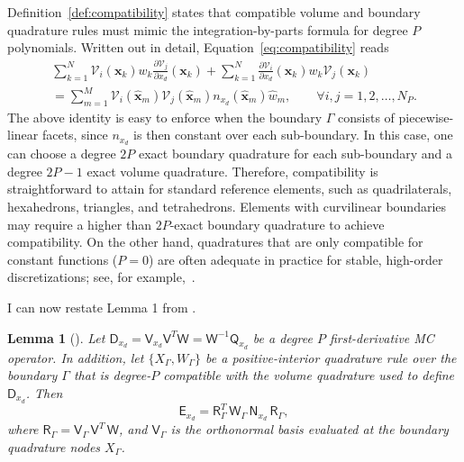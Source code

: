 \documentclass[pdflatex,sn-mathphys-num]{sn-jnl}%
\theoremstyle{thmstyleone}%
\newtheorem{lemma}{Lemma}%
\theoremstyle{thmstyletwo}%
\theoremstyle{thmstylethree}%
\newcommand{\mat}[1]{\ensuremath{\mathsf{#1}}}
\newcommand{\fnc}[1]{\ensuremath{\mathcal{#1}}}
\begin{document}
Definition~\ref{def:compatibility} states that compatible volume and boundary quadrature rules must mimic the integration-by-parts formula for degree $P$ polynomials.  Written out in detail, Equation~\eqref{eq:compatibility} reads
\begin{multline*}
    \sum_{k=1}^{N} \fnc{V}_i(\bm{x}_k) w_k \frac{\partial \fnc{V}_j}{\partial x_d}(\bm{x}_k) + \sum_{k=1}^{N} \frac{\partial \fnc{V}_i}{\partial x_d} (\bm{x}_k) w_k \fnc{V}_j (\bm{x}_k) \\
    = \sum_{m=1}^{M} \fnc{V}_i(\hat{\bm{x}}_m) \fnc{V}_j(\hat{\bm{x}}_m) n_{x_d}(\hat{\bm{x}}_m) \hat{w}_m,\qquad \forall i,j = 1,2,\ldots,N_P.
\end{multline*}
The above identity is easy to enforce when the boundary $\Gamma$ consists of piecewise-linear facets, since $n_{x_d}$ is then constant over each sub-boundary.  In this case, one can choose a degree $2P$ exact boundary quadrature for each sub-boundary and a degree $2P-1$ exact volume quadrature.  Therefore, compatibility is straightforward to attain for standard reference elements, such as quadrilaterals, hexahedrons, triangles, and tetrahedrons.  Elements with curvilinear boundaries may require a higher than $2P$-exact boundary quadrature to achieve compatibility. On the other hand, quadratures that are only compatible for constant functions ($P=0$) are often adequate in practice for stable, high-order discretizations; see, for example,~\cite[Sec.~5]{Crean2018entropy}.

I can now restate Lemma 1 from \cite{Chan2018discretely}.


\begin{lemma}[\cite{Chan2018discretely}]\label{thm:mc_boundary}
    Let $\mat{D}_{x_d} = \mat{V}_{x_d} \mat{V}^T \mat{W} = \mat{W}^{-1} \mat{Q}_{x_d}$ be a degree $P$ first-derivative MC operator.  In addition, let $\{ X_{\Gamma}, W_{\Gamma} \}$ be a positive-interior quadrature rule over the boundary $\Gamma$ that is degree-$P$ compatible with the volume quadrature used to define $\mat{D}_{x_d}$.  Then 
    \begin{equation}\label{eq:mc_boundary}
        \mat{E}_{x_d} = \mat{R}_{\Gamma}^{T}\, \mat{W}_{\Gamma}\, \mat{N}_{x_d}\, \mat{R}_{\Gamma},
    \end{equation}
    where $\mat{R}_{\Gamma} = \mat{V}_{\Gamma}\, \mat{V}^T\, \mat{W}$, and $\mat{V}_{\Gamma}$ is the orthonormal basis evaluated at the boundary quadrature nodes $X_{\Gamma}$.
\end{lemma}
\end{document}
